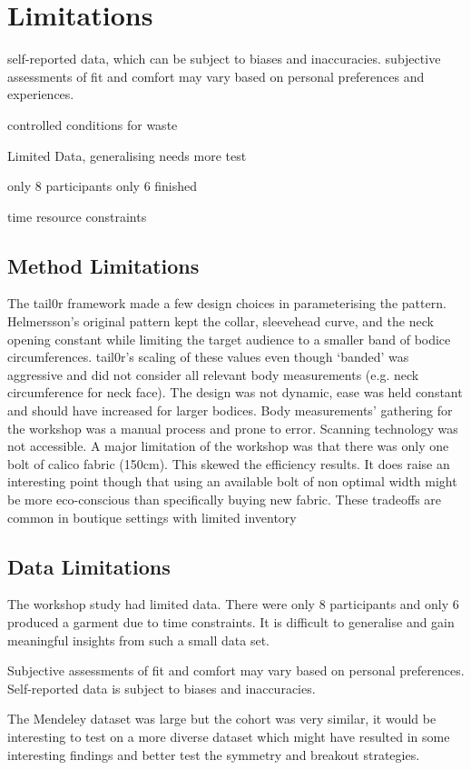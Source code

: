 \section{Limitations}
self-reported data, which can be subject to biases and inaccuracies. subjective assessments of fit and comfort may vary based on personal preferences and experiences. 

controlled conditions for waste

Limited Data, generalising needs more test

only 8 participants only 6 finished

time resource constraints

\subsection{Method Limitations}
The tail0r framework made a few design choices in parameterising the pattern. Helmersson's original pattern kept the collar, sleevehead curve, and the neck opening constant while limiting the target audience to a smaller band of bodice circumferences.
tail0r’s scaling of these values even though ‘banded’ was aggressive and did not consider all relevant body measurements (e.g. neck circumference for neck face). The design was not dynamic, ease was held constant and should have increased for larger bodices.
Body measurements’ gathering for the workshop was a manual process and prone to error. Scanning technology was not accessible. 
A major limitation of the workshop was that there was only one bolt of calico fabric (150cm). This skewed the efficiency results. It does raise an interesting point though that using an available bolt of non optimal width might be more eco-conscious than specifically buying new fabric. These tradeoffs are common in boutique settings with limited inventory

\subsection{Data Limitations}
The workshop study had limited data. There were only 8 participants and only 6 produced a garment due to time constraints. It is difficult to generalise and gain meaningful insights from such a small data set.

Subjective assessments of fit and comfort may vary based on personal preferences. Self-reported data is subject to biases and inaccuracies.

The Mendeley dataset was large but the cohort was very similar, it would be interesting to test on a more diverse dataset which might have resulted in some interesting findings and better test the symmetry and breakout strategies.


